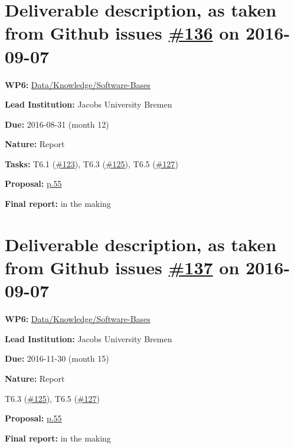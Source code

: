 \section*{\texorpdfstring{Deliverable description, as taken from Github
issues
\href{https://github.com/OpenDreamKit/OpenDreamKit/issues/136}{\#136} on
2016-09-07}{Deliverable description, as taken from Github issue's \#136 on 2016-09-07}}\label{deliverable-description-as-taken-from-github-issues-136-on-2016-09-07}

\begin{compactitem}
\tightlist
\item
  \textbf{WP6:}
  \href{https://github.com/OpenDreamKit/OpenDreamKit/tree/master/WP6}{Data/Knowledge/Software-Bases}
\item
  \textbf{Lead Institution:} Jacobs University Bremen
\item
  \textbf{Due:} 2016-08-31 (month 12)
\item
  \textbf{Nature:} Report
\item
  \textbf{Tasks:} T6.1
  (\href{https://github.com/OpenDreamKit/OpenDreamKit/issues/123}{\#123}),
  T6.3
  (\href{https://github.com/OpenDreamKit/OpenDreamKit/issues/125}{\#125}),
  T6.5
  (\href{https://github.com/OpenDreamKit/OpenDreamKit/issues/127}{\#127})
\item
  \textbf{Proposal:}
  \href{https://github.com/OpenDreamKit/OpenDreamKit/raw/master/Proposal/proposal-www.pdf}{p.55}
\item
  \textbf{Final report:} in the making
\end{compactitem}

\section*{\texorpdfstring{Deliverable description, as taken from Github issues
    \href{https://github.com/OpenDreamKit/OpenDreamKit/issues/137}{\#137} on
    2016-09-07}{Deliverable description, as taken from Github issue's \#137 on
    2016-09-07}}\label{deliverable-description-as-taken-from-github-issues-137-on-2016-09-07}
\begin{compactitem}
\tightlist
\item
  \textbf{WP6:}
  \href{https://github.com/OpenDreamKit/OpenDreamKit/tree/master/WP6}{Data/Knowledge/Software-Bases}
\item
  \textbf{Lead Institution:} Jacobs University Bremen
\item
  \textbf{Due:} 2016-11-30 (month 15)
\item
  \textbf{Nature:} Report
\item
  T6.3
  (\href{https://github.com/OpenDreamKit/OpenDreamKit/issues/125}{\#125}),
  T6.5
  (\href{https://github.com/OpenDreamKit/OpenDreamKit/issues/127}{\#127})
\item
  \textbf{Proposal:}
  \href{https://github.com/OpenDreamKit/OpenDreamKit/raw/master/Proposal/proposal-www.pdf}{p.55}
\item
  \textbf{Final report:} in the making
\end{compactitem}

